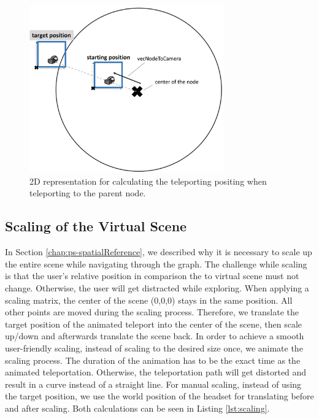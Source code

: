 \begin{figure}[h]
    \centering
    \includegraphics[width=0.75\textwidth]{graphics/flyToParentNode.jpg}
    \caption{2D representation for calculating the teleporting positing when teleporting to the parent node.} 
    \label{fig:vrFlyToParentNode} 
\end{figure}

\pagebreak

\subsection{Scaling of the Virtual Scene}
\label{sec:scaling}

In Section \ref{chap:ps-spatialReference}, we described why it is necessary to scale up the entire scene while navigating through the graph. 
The challenge while scaling is that the user's relative position in comparison the to virtual scene must not change. Otherwise, the user will get distracted while exploring.
When applying a scaling matrix, the center of the scene (0,0,0) stays in the same position. All other points are moved during the scaling process. 
Therefore, we translate the target position of the animated teleport into the center of the scene, then scale up/down and afterwards translate the scene back.
In order to achieve a smooth user-friendly scaling, instead of scaling to the desired size once, we animate the scaling process. The duration of the animation has to be the exact time as the animated teleportation. 
Otherwise, the teleportation path will get distorted and result in a curve instead of a straight line.
For manual scaling, instead of using the target position, we use the world position of the headset for translating before and after scaling. Both calculations can be seen in Listing \ref{lst:scaling}.
\pagebreak

